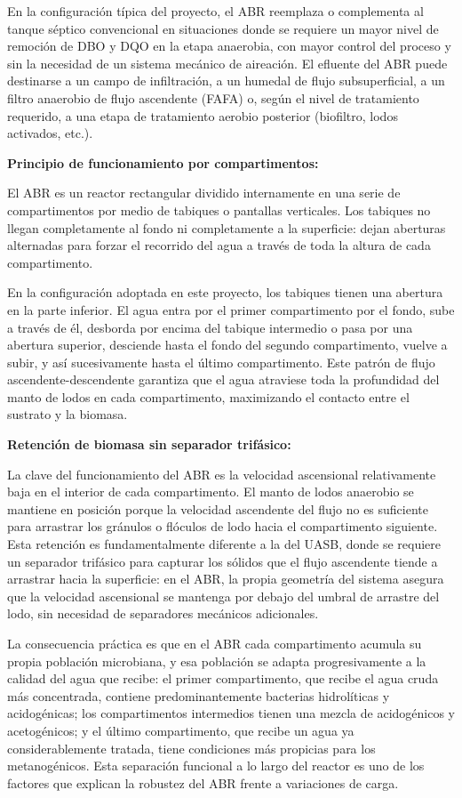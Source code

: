 \documentclass[12pt,a4paper]{article}
\begin{document}
En la configuración típica del proyecto, el ABR reemplaza o complementa al tanque séptico convencional en situaciones donde se requiere un mayor nivel de remoción de DBO y DQO en la etapa anaerobia, con mayor control del proceso y sin la necesidad de un sistema mecánico de aireación. El efluente del ABR puede destinarse a un campo de infiltración, a un humedal de flujo subsuperficial, a un filtro anaerobio de flujo ascendente (FAFA) o, según el nivel de tratamiento requerido, a una etapa de tratamiento aerobio posterior (biofiltro, lodos activados, etc.).

\textbf{Principio de funcionamiento por compartimentos:}

El ABR es un reactor rectangular dividido internamente en una serie de compartimentos por medio de tabiques o pantallas verticales. Los tabiques no llegan completamente al fondo ni completamente a la superficie: dejan aberturas alternadas para forzar el recorrido del agua a través de toda la altura de cada compartimento.

En la configuración adoptada en este proyecto, los tabiques tienen una abertura en la parte inferior. El agua entra por el primer compartimento por el fondo, sube a través de él, desborda por encima del tabique intermedio o pasa por una abertura superior, desciende hasta el fondo del segundo compartimento, vuelve a subir, y así sucesivamente hasta el último compartimento. Este patrón de flujo ascendente-descendente garantiza que el agua atraviese toda la profundidad del manto de lodos en cada compartimento, maximizando el contacto entre el sustrato y la biomasa.

\textbf{Retención de biomasa sin separador trifásico:}

La clave del funcionamiento del ABR es la velocidad ascensional relativamente baja en el interior de cada compartimento. El manto de lodos anaerobio se mantiene en posición porque la velocidad ascendente del flujo no es suficiente para arrastrar los gránulos o flóculos de lodo hacia el compartimento siguiente. Esta retención es fundamentalmente diferente a la del UASB, donde se requiere un separador trifásico para capturar los sólidos que el flujo ascendente tiende a arrastrar hacia la superficie: en el ABR, la propia geometría del sistema asegura que la velocidad ascensional se mantenga por debajo del umbral de arrastre del lodo, sin necesidad de separadores mecánicos adicionales.

La consecuencia práctica es que en el ABR cada compartimento acumula su propia población microbiana, y esa población se adapta progresivamente a la calidad del agua que recibe: el primer compartimento, que recibe el agua cruda más concentrada, contiene predominantemente bacterias hidrolíticas y acidogénicas; los compartimentos intermedios tienen una mezcla de acidogénicos y acetogénicos; y el último compartimento, que recibe un agua ya considerablemente tratada, tiene condiciones más propicias para los metanogénicos. Esta separación funcional a lo largo del reactor es uno de los factores que explican la robustez del ABR frente a variaciones de carga.
\end{document}
